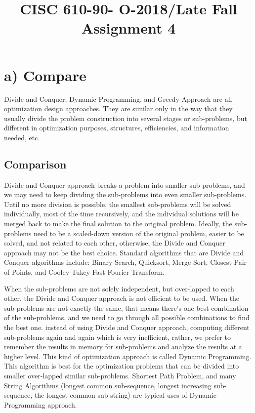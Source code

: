 \documentclass[natbib,12pt]{article}
\title{CISC 610-90- O-2018/Late Fall \linebreak Assignment 4}
\date{}
\begin{document}
	\maketitle
	
	\section*{a) Compare}
	
	Divide and Conquer, Dynamic Programming, and Greedy Approach are all optimization design approaches. They are similar only in the way that they usually divide the problem construction into several stages or sub-problems, but different in optimization purposes, structures, efficiencies, and information needed, etc.
	
	\subsection*{Comparison}
	Divide and Conquer approach breaks a problem into smaller sub-problems, and we may need to keep dividing the sub-problems into even smaller sub-problems. Until no more division is possible, the smallest sub-problems will be solved individually, most of the time recursively, and the individual solutions will be merged back to make the final solution to the original problem. Ideally, the sub-problems need to be a scaled-down version of the original problem, easier to be solved, and not related to each other, otherwise, the Divide and Conquer approach may not be the best choice. Standard algorithms that are Divide and Conquer algorithms include: Binary Search, Quicksort, Merge Sort, Closest Pair of Points, and Cooley-Tukey Fast Fourier Transform.
	
	When the sub-problems are not solely independent, but over-lapped to each other, the Divide and Conquer approach is not efficient to be used. When the sub-problems are not exactly the same, that means there's one best combination of the sub-problems, and we need to go through all possible combinations to find the best one. instead of using Divide and Conquer approach, computing different sub-problems again and again which is very inefficient, rather, we prefer to remember the results in memory for sub-problems and analyze the results at a higher level. This kind of optimization approach is called Dynamic Programming. This algorithm is best for the optimization problems that can be divided into smaller over-lapped similar sub-problems. Shortest Path Problem, and many String Algorithms (longest common sub-sequence, longest increasing sub-sequence, the longest common sub-string) are typical uses of Dynamic Programming approach.
	
\end{document}
